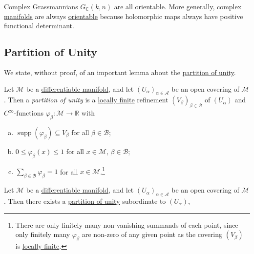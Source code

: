 \begin{remark}
	\hyperref[def:complex-manifold]{Complex} \hyperref[def:Grassmannian-manifold]{Grassmannians} \(G_{\mathbb{C} }(k, n)\) are all \hyperref[def:orientable]{orientable}. More generally, \hyperref[def:complex-manifold]{complex manifolds} are always \hyperref[def:orientable]{orientable} because holomorphic maps always have positive functional determinant.
\end{remark}

\subsection{Partition of Unity}
We state, without proof, of an important lemma about the \hyperref[def:partition-of-unity]{partition of unity}.

\begin{definition}\label{def:partition-of-unity}
	Let \(\mathcal{M} \) be a \hyperref[def:smooth-manifold]{differentiable manifold}, and let \((U_\alpha )_{\alpha \in \mathcal{A} }\) be an open covering of \(\mathcal{M} \). Then a \emph{partition of unity} is a \hyperref[def:locally-finite]{locally finite} refinement \((V_\beta )_{\beta \in \mathcal{B} }\) of \((U_\alpha )\) and \(C^{\infty} \)-functions \(\varphi _\beta \colon \mathcal{M} \to  \mathbb{R} \) with
	\begin{enumerate}[(a)]
		\item \(\mathop{\mathrm{supp}}(\varphi _\beta ) \subseteq V_\beta  \) for all \(\beta \in \mathcal{B} \);
		\item \(0 \leq \varphi _\beta (x) \leq 1\) for all \(x\in \mathcal{M} \), \(\beta \in \mathcal{B} \);
		\item \(\sum_{\beta \in \mathcal{B} } \varphi _\beta = 1 \) for all \(x\in \mathcal{M} \).\footnote{There are only finitely many non-vanishing summands of each point, since only finitely many \(\varphi _\beta \) are non-zero of any given point as the covering \((V_\beta )\) is \hyperref[def:locally-finite]{locally finite}.}
	\end{enumerate}
\end{definition}

\begin{lemma}\label{lma:partition-of-unity}
	Let \(\mathcal{M} \) be a \hyperref[def:smooth-manifold]{differentiable manifold}, and let \((U_\alpha )_{\alpha \in \mathcal{A} }\) be an open covering of \(\mathcal{M} \). Then there exists a \hyperref[def:partition-of-unity]{partition of unity} subordinate to \((U_\alpha )\),
\end{lemma}

